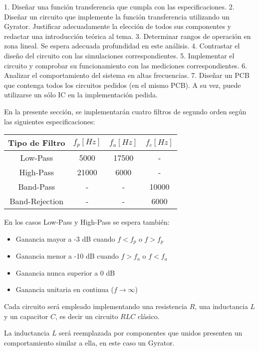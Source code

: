 1. Diseñar una función transferencia que cumpla con las especificaciones.
2. Diseñar un circuito que implemente la función transferencia utilizando un Gyrator. Justificar adecuadamente la elección de todos sus componentes y redactar una introducción teórica al tema.
3. Determinar rangos de operación en zona lineal. Se espera adecuada profundidad en este análisis.
4. Contrastar el diseño del circuito con las simulaciones correspondientes.
5. Implementar el circuito y comprobar su funcionamiento con las mediciones correspondientes.
6. Analizar el comportamiento del sistema en altas frecuencias.
7. Diseñar un PCB que contenga todos los circuitos pedidos (en el mismo PCB). A su vez, puede utilizarse un
sólo IC en la implementación pedida.

En la presente sección, se implementarán cuatro filtros de segundo orden según las siguientes especificaciones:

\begin{table}[H]
    \centering
    \begin{tabular}{|c|c|c|c|}
    \hline
    \rowcolor[HTML]{C0C0C0} 
    Tipo de Filtro & $f_p[Hz]$ & $f_a[Hz]$ & $f_c[Hz]$ \\ \hline
    Low-Pass       & 5000   & 17500  & -      \\ \hline
    High-Pass      & 21000   & 6000   & -      \\ \hline
    Band-Pass      & -      & -      & 10000  \\ \hline
    Band-Rejection & -      & -      & 6000   \\ \hline
    \end{tabular}
    \end{table}

En los casos Low-Pass y High-Pass se espera también:

\begin{itemize}
	\item Ganancia mayor a -3 dB cuando $f < f_p$ o $f > f_p$ 
	\item Ganancia menor a -10 dB cuando $f > f_a$ o $f < f_a$
	\item Ganancia nunca superior a 0 dB
	\item Ganancia unitaria en continua ($f \to \infty$)
\end{itemize}

Cada circuito será empleado implementando una resistencia $R$, una inductancia $L$ y un capacitor $C$, es decir un circuito $RLC$
clásico. 

La inductancia $L$ será reemplazada por componentes que unidos presenten un comportamiento similar a ella, en este caso
un Gyrator. 

